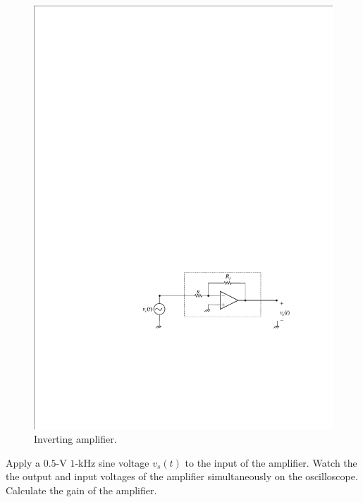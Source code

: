 \documentclass[11pt]{article}
\begin{document}

\begin{question}


    \begin{figure}[H]
        \centering
        \includegraphics[scale=1.2,angle=0]{Fig/cir3.pdf}
        \caption{Inverting amplifier.} \label{fig:cir3}
    \end{figure}

    \begin{subquestion}{Apply a $0.5$-V $1$-kHz sine voltage $v_{s}(t)$ to the input of the amplifier. Watch the the output and input voltages of the amplifier simultaneously on the oscilloscope. Calculate the gain of the amplifier.}
        \answer{}
    \end{subquestion}


\end{question}
\end{document}
